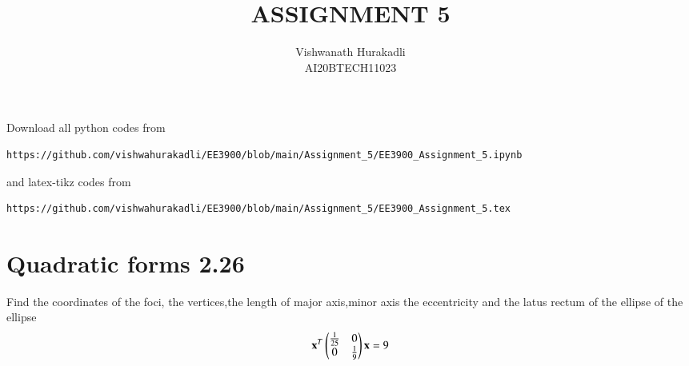 \documentclass[journal,12pt,twocolumn]{IEEEtran}
\begin{document}
     \def\centbox#1{\makebox[0in]{#1}}
     \def\topbox#1{\raisebox{-\baselineskip}[0in][0in]{#1}}
     \def\midbox#1{\raisebox{-0.5\baselineskip}[0in][0in]{#1}}
\vspace{3cm}
\title{ASSIGNMENT 5}
\author{Vishwanath Hurakadli \\ AI20BTECH11023}
\maketitle
\newpage
\bigskip
\renewcommand{\thefigure}{\theenumi}
\renewcommand{\thetable}{\theenumi}
Download all python codes from 
\begin{lstlisting}
https://github.com/vishwahurakadli/EE3900/blob/main/Assignment_5/EE3900_Assignment_5.ipynb
\end{lstlisting}
%
and latex-tikz codes from 
%
\begin{lstlisting}
https://github.com/vishwahurakadli/EE3900/blob/main/Assignment_5/EE3900_Assignment_5.tex
\end{lstlisting}
\section{Quadratic forms 2.26}
Find the coordinates of the foci, the vertices,the length of major axis,minor axis the
eccentricity and the latus rectum of the ellipse of the ellipse
\begin{align}
  \mathbf{x}^T\begin{pmatrix}\frac{1}{25}&0\\0&\frac{1}{9}\end{pmatrix}\mathbf{x}=9   
\end{align}
%
\end{document}
